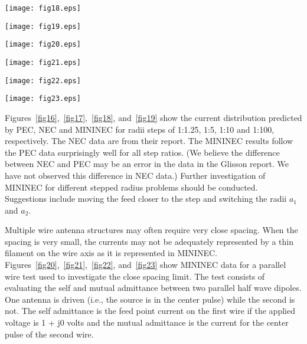 \documentclass[12pt]{article}
\begin{document}
\begin{sidewaysfigure}[htb]
\centerline{\texttt{[image: fig18.eps]}}
\caption{Currents for a stepped radius junction of $a_2/a_1 = 10$}
\label{fig18}
\end{sidewaysfigure}

\begin{sidewaysfigure}[htb]
\centerline{\texttt{[image: fig19.eps]}}
\caption{Currents for a stepped radius junction of $a_2/a_1 = 100$}
\label{fig19}
\end{sidewaysfigure}

\begin{sidewaysfigure}[htb]
\centerline{\texttt{[image: fig20.eps]}}
\caption{Self admittance computed by MININEC compared to the theory by
R. W. P. King for two parallel dipoles}
\label{fig20}
\end{sidewaysfigure}

\begin{sidewaysfigure}[htb]
\centerline{\texttt{[image: fig21.eps]}}
\caption{Mutual admittance computed by MININEC compared to the theory by
R. W. P. King for two parallel dipoles}
\label{fig21}
\end{sidewaysfigure}

\begin{sidewaysfigure}[htb]
\centerline{\texttt{[image: fig22.eps]}}
\caption{Magnitude of the mutual admittance between closely spaced
parallel dipoles}
\label{fig22}
\end{sidewaysfigure}

\begin{sidewaysfigure}[htb]
\centerline{\texttt{[image: fig23.eps]}}
\caption{Phase of the mutual admittance between closely spaced
parallel dipoles}
\label{fig23}
\end{sidewaysfigure}
\afterpage\clearpage

Figures~\ref{fig16},~\ref{fig17},~\ref{fig18}, and~\ref{fig19} show the
current distribution predicted by PEC, NEC and MININEC for radii steps
of 1:1.25, 1:5, 1:10 and 1:100, respectively. The NEC data are from
their report. The MININEC results follow the PEC data surprisingly well
for all step ratios. (We believe the difference between NEC and PEC may
be an error in the data in the Glisson report. We have not observed this
difference in NEC data.) Further investigation of MININEC for different
stepped radius problems should be conducted. Suggestions include moving
the feed closer to the step and switching the radii $a_1$ and $a_2$.

Multiple wire antenna structures may often require very close spacing.
When the spacing is very small, the currents may not be adequately
represented by a thin filament on the wire axis as it is represented in
MININEC. Figures~\ref{fig20},~\ref{fig21},~\ref{fig22}, and~\ref{fig23}
show MININEC data for a parallel wire test used to investigate the close
spacing limit. The test consists of evaluating the self and mutual
admittance between two parallel half wave dipoles. One antenna is driven
(i.e., the source is in the center pulse) while the second is not. The
self admittance is the feed point current on the first wire if the
applied voltage is 1 + j0 volts and the mutual admittance is the current
for the center pulse of the second wire.
\end{document}
